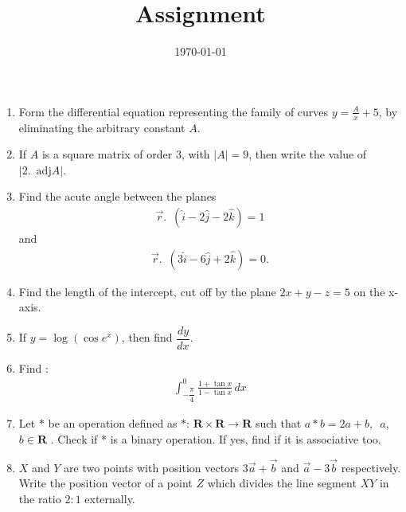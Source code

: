 \documentclass[12pt,-letter paper]{article}
\title{Assignment}
\date{\today}
\providecommand{\brak}[1]{\ensuremath{\left(#1\right)}}
\providecommand{\abs}[1]{\left\vert#1\right\vert}
\begin{document}

\begin{enumerate}
	\item Form the differential equation representing the family of curves $y=\frac{A}{x}+5$, by eliminating the arbitrary constant $A$.

     \item If $A$ is a square matrix of order $3$, with $\abs{A} = 9$, then write the value of $\abs{2.\hspace{6pt}\text{adj}A}$.

     \item Find the acute angle between the planes 
     \begin{align*}
     \overrightarrow{r}.\hspace{6pt}\brak{\hat{i}-2\hat{j}-2\hat{k}}=1
     \end{align*}
      and 
      \begin{align*}
          \overrightarrow{r}.\hspace{6pt}\brak{3\hat{i}-6\hat{j}+2\hat{k}}=0.
      \end{align*}
     
     \item Find the length of the intercept, cut off by the plane $2x+y-z=5$ on the x-axis.
     
     \item If $y=\log(\cos{e^x})$, then find $\dfrac{dy}{dx}$.

     \item Find :
        \begin{align*}
         \int_{-\dfrac{\pi}{4}}^{0}  \frac{1+\tan{x}}{1- \tan{x}} \,dx
        \end{align*}

    \item Let $*$ be an operation defined as $*$: $\textbf{R}\times\textbf{R}\rightarrow \textbf{R} $ such that $a * b = 2a + b,\hspace{6pt}a$, $b\in \textbf{R} $ . Check if * is a binary operation. If yes, find if it is associative too.

    \item $X$ and $Y$ are two points with position vectors $3\overrightarrow{a}+\overrightarrow{b}$ and $\overrightarrow{a}-3\overrightarrow{b}$ respectively. Write the position vector of a point $Z$ which divides the line segment $XY$ in the ratio $2:1$ externally.


\end{enumerate}
\end{document}
